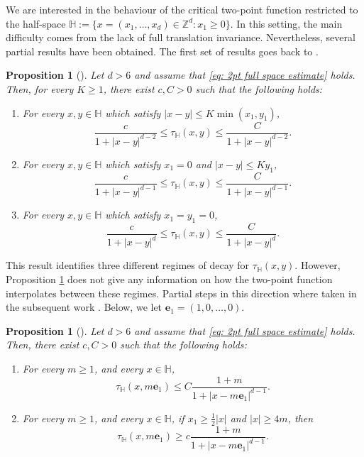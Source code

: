 \documentclass[11pt,a4paper]{article}
\numberwithin{equation}{section}
\theoremstyle{plain}
\newtheorem{Prop}[Thm]{Proposition}
\theoremstyle{definition}
\begin{document}
We are interested in the behaviour of the critical two-point function restricted to the half-space $\mathbb H:=\{x=(x_1,\dots,x_d) \in \mathbb Z^d :  x_1\ge 0\}$. In this setting, the main difficulty comes from the lack of full translation invariance. Nevertheless, several partial results have been obtained. The first set of results goes back to \cite{ChatterjeeHanson}. 
\begin{Prop}[]\label{prop:chatterjeehanson} Let $d>6$ and assume that \eqref{eq: 2pt full space estimate} holds. Then, for every $K\geq 1$, there exist $c,C>0$ such that the following holds:
\begin{enumerate}
	\item[$(a)$] For every $x,y\in \mathbb H$ which satisfy $|x-y|\leq K\min(x_1,y_1)$,
	\begin{equation}\label{CH1}
		\frac{c}{1+|x-y|^{d-2}}\leq \tau_{\mathbb H}(x,y)\leq \frac{C}{1+|x-y|^{d-2}}.
	\end{equation}
	\item[$(b)$] For every $x,y\in \mathbb H$ which satisfy $x_1=0$ and $|x-y|\leq Ky_1$,
	\begin{equation}\label{CH2}
		\frac{c}{1+|x-y|^{d-1}}\leq \tau_{\mathbb H}(x,y)\leq \frac{C}{1+|x-y|^{d-1}}.
	\end{equation}
	\item[$(c)$] For every $x,y \in \mathbb H$ which satisfy $x_1=y_1=0$,
	\begin{equation}\label{CH3}
		\frac{c}{1+|x-y|^{d}}\leq \tau_{\mathbb H}(x,y)\leq \frac{C}{1+|x-y|^{d}}.
	\end{equation}
\end{enumerate}
\end{Prop}
This result identifies three different regimes of decay for $\tau_{\mathbb H}(x,y)$. However, Proposition \ref{prop:chatterjeehanson} does not give any information on how the two-point function interpolates between these regimes. Partial steps in this direction where taken in the subsequent work \cite{ChatterjeeHansonSosoe2023subcritical}. Below, we let $\mathbf{e}_1=(1,0,\ldots,0)$.
\begin{Prop}[]\label{prop:chatterjeehansonsosoe} Let $d>6$ and assume that \eqref{eq: 2pt full space estimate} holds. Then, there exist $c,C>0$ such that the following holds:
\begin{enumerate}
	\item[$(a)$] For every $m\geq 1$, and every $x\in \mathbb H$, 
	\begin{equation}\label{CHS1}
		\tau_{\mathbb H}(x,m\mathbf{e}_1)\leq C\frac{1+m}{1+|x-m\mathbf{e}_1|^{d-1}}.
	\end{equation}
	\item[$(b)$] For every $m\geq 1$, and every $x\in \mathbb H$, if $x_1\geq \tfrac{1}{2}|x|$ and $|x|\geq 4m$, then
	\begin{equation}\label{CHS2}
		\tau_{\mathbb H}(x,m\mathbf{e}_1)\geq c\frac{1+m}{1+|x-m\mathbf{e}_1|^{d-1}}.
	\end{equation}
\end{enumerate}
\end{Prop}
\end{document}
